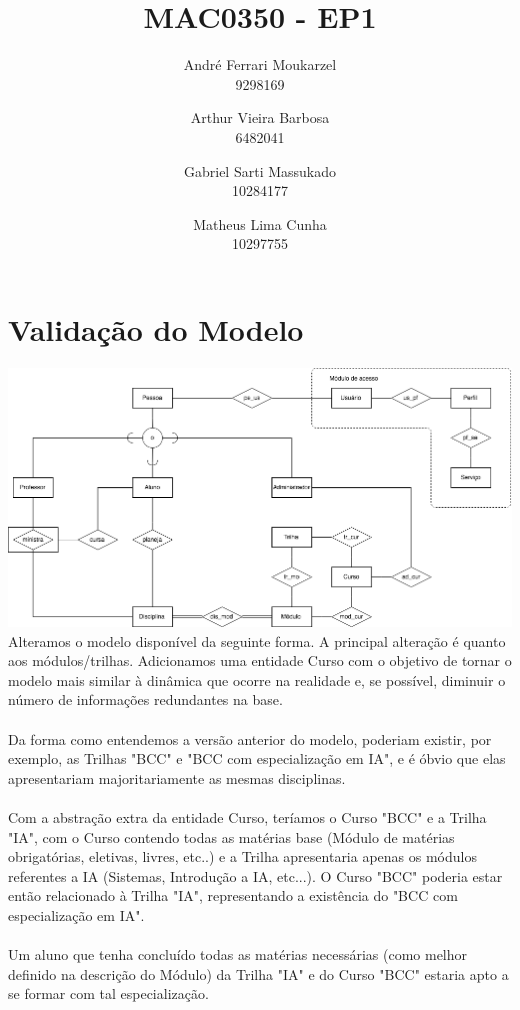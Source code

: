 \documentclass{article}
\title{MAC0350 - EP1}
\date{}
\author{
  André Ferrari Moukarzel \\ 9298169
  \and
  Arthur Vieira Barbosa \\ 6482041
  \and
  Gabriel Sarti Massukado \\ 10284177
  \and
  Matheus Lima Cunha \\ 10297755
}
\begin{document}
  \maketitle
  \newpage
  
  \section{Validação do Modelo}
  
  \includegraphics[width=\textwidth]{MAC350.png}\\
  
  Alteramos o modelo disponível da seguinte forma. A principal alteração é quanto aos módulos/trilhas. Adicionamos uma entidade Curso com o objetivo de tornar o modelo mais similar à dinâmica que ocorre na realidade e, se possível, diminuir o número de informações redundantes na base. \\
  \\
  Da forma como entendemos a versão anterior do modelo, poderiam existir, por exemplo, as Trilhas "BCC" e "BCC com especialização em IA", e é óbvio que elas apresentariam majoritariamente as mesmas disciplinas. \\
  \\
  Com a abstração extra da entidade Curso, teríamos o Curso "BCC" e a Trilha "IA", com o Curso contendo todas as matérias base (Módulo de matérias obrigatórias, eletivas, livres, etc..) e a Trilha apresentaria apenas os módulos referentes a IA (Sistemas, Introdução a IA, etc...). O Curso "BCC" poderia estar então relacionado à Trilha "IA", representando a existência do "BCC com especialização em IA". \\
  \\
  Um aluno que tenha concluído todas as matérias necessárias (como melhor definido na descrição do Módulo) da Trilha "IA" e do Curso "BCC" estaria apto a se formar com tal especialização.
  
\end{document}
